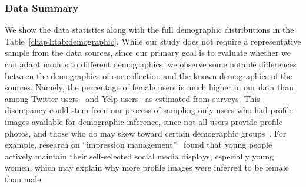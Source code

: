 \begin{table}[t]
\centering
{}
\caption{Dataset statistics including user demographic distributions for four user factors.}
\label{chap4:tab:demographic}
\end{table}

\subsubsection{Data Summary}
We show the data statistics along with the full demographic distributions in the Table~\ref{chap4:tab:demographic}.
While our study does not require a representative sample from the data sources,
since our primary goal is to evaluate whether we can adapt models to different demographics,
we observe some notable differences between the demographics of our collection and the known demographics of the sources.
Namely, the percentage of female users is much higher in our data than among Twitter users~\cite{tien_2018} and Yelp users~\cite{yelp_2018} as estimated from surveys. 
This discrepancy could stem from our process of sampling only users who had profile images available for demographic inference,
since not all users provide profile photos,
and those who do may skew toward certain demographic groups~\cite{rose2012face}.
For example, research on ``impression management''~\cite{rose2012face} found that young people actively maintain their self-selected social media displays, especially young women, which may explain why more profile images were inferred to be female than male.

